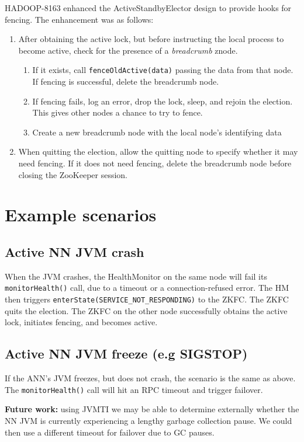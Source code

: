 \documentclass{article}
\begin{document}
HADOOP-8163 enhanced the ActiveStandbyElector design to provide hooks for fencing. The enhancement was as follows:
\begin{enumerate}
\item After obtaining the active lock, but before instructing the local process to become active, check for the presence of a {\em breadcrumb} znode.
  \begin{enumerate}
  \item If it exists, call {\tt fenceOldActive(data)} passing the data from that node. If fencing is successful, delete the breadcrumb node.
  \item If fencing fails, log an error, drop the lock, sleep, and rejoin the election. This gives other nodes a chance to try to fence.
  \item Create a new breadcrumb node with the local node's identifying data
  \end{enumerate}
\item When quitting the election, allow the quitting node to specify whether it may need fencing. If it does not need fencing, delete the breadcrumb node before closing the ZooKeeper session.
\end{enumerate}

\section{Example scenarios}

\subsection{Active NN JVM crash}

When the JVM crashes, the HealthMonitor on the same node will fail its {\tt monitorHealth()} call, due to a timeout or a connection-refused error. The HM then triggers {\tt enterState(SERVICE\_NOT\_RESPONDING)} to the ZKFC. The ZKFC quits the election. The ZKFC on the other node successfully obtains the active lock, initiates fencing, and becomes active.

\subsection{Active NN JVM freeze (e.g SIGSTOP)}

If the ANN's JVM freezes, but does not crash, the scenario is the same as above. The {\tt monitorHealth()} call will hit an RPC timeout and trigger failover.

{\bf Future work:} using JVMTI we may be able to determine externally whether the NN JVM is currently experiencing a lengthy garbage collection pause. We could then use a different timeout for failover due to GC pauses.
\end{document}
